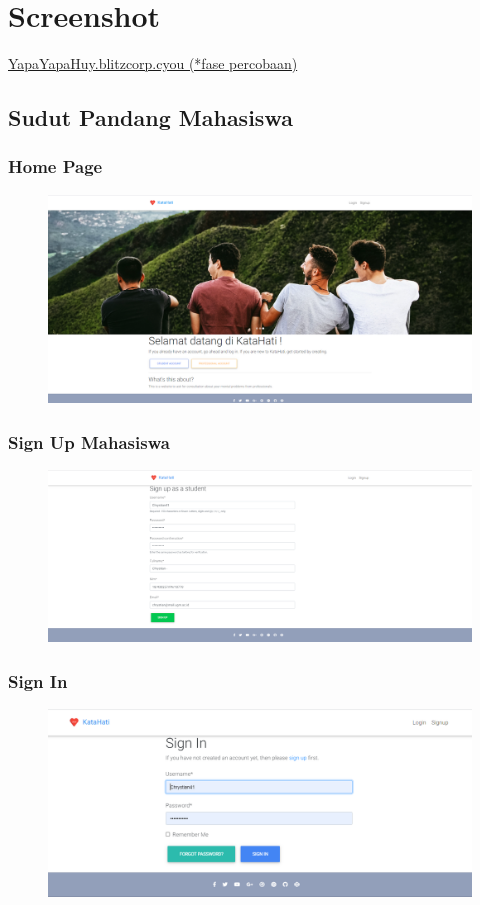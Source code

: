 \documentclass{article}
\begin{document}
	\section{Screenshot}
	\href{http://yapayapahuy.blitzcorp.cyou/}{YapaYapaHuy.blitzcorp.cyou (*fase percobaan)}
	\subsection{Sudut Pandang Mahasiswa}
	\subsubsection{Home Page}
	\begin{figure}[H]
		\centering
		\includegraphics[width=480px]{Home Page.png}
	\end{figure}

	\subsubsection{Sign Up Mahasiswa}
	\begin{figure}[H]
		\centering
		\includegraphics[width=480px]{Sign Up Mahasiswa.png}
	\end{figure}

	\subsubsection{Sign In}
	\begin{figure}[H]
		\centering
		\includegraphics[width=480px]{Sign In.png}
	\end{figure}
\end{document}
